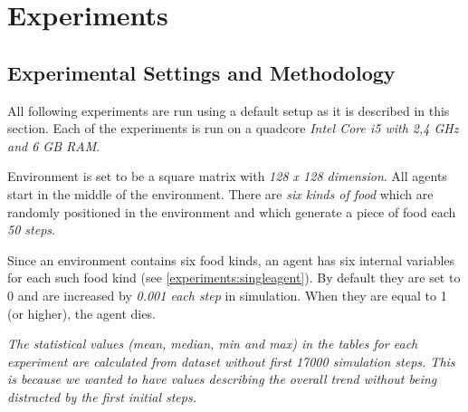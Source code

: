 \chapter{Experiments}




\section{Experimental Settings and Methodology}

All following experiments are run using a default setup as it is described in this section. Each of the experiments is run on a quadcore \emph{Intel Core i5 with 2,4 GHz and 6 GB RAM}. 
                                                   
Environment is set to be a square matrix with \emph{128 x 128 dimension}. All agents start in the middle of the environment. There are \emph{six kinds of food} which are randomly positioned in the environment and which generate a piece of food each \emph{50 steps}.

Since an environment contains six food kinds, an agent has six internal variables for each such food kind (see \ref{experiments:singleagent}). By default they are set to 0 and are increased by \emph{0.001 each step} in simulation. When they are equal to 1 (or higher), the agent dies.  

\textit{The statistical values (mean, median, min and max) in the tables for each experiment are calculated from dataset without first 17000 simulation steps. This is because we wanted to have values describing the overall trend without being distracted by the first initial steps.}

